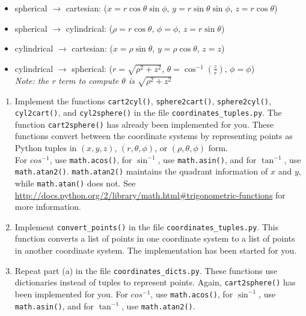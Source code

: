 \documentclass{article}
\newcounter{points}
\begin{document}
\begin{enumerate}
\begin{itemize}
\item{spherical $\rightarrow$ cartesian: ($x = r\cos\theta\sin\phi$, $y = r\sin\theta\sin\phi$, $z = r\cos\theta$)}
\item{spherical $\rightarrow$ cylindrical: ($\rho = r\cos\theta$, $\phi = \phi$, $z = r\sin\theta$)}

\item{cylindrical $\rightarrow$ cartesian: ($x = \rho\sin\theta$, $y = \rho\cos\theta$, $z = z$)}
\item{cylindrical $\rightarrow$ spherical: ($r = \sqrt{\rho^2 + z^2}$, $\theta = \cos^{-1}\left(\frac{z}{r}\right)$, $\phi = \phi$)  \\
\emph{Note: the r term to compute $\theta$ is $\sqrt{\rho^2 + z^2}$}
}
\end{itemize}

\begin{enumerate}
\item Implement the functions \texttt{cart2cyl()}, \texttt{sphere2cart()}, \texttt{sphere2cyl()}, \texttt{cyl2cart()}, and \texttt{cyl2sphere()} in the file \texttt{coordinates\_tuples.py}.  The function \texttt{cart2sphere()} has already been implemented for you.  These functions convert between the coordinate systems by representing points as Python tuples in $(x, y, z)$, $(r, \theta, \phi)$, or $(\rho, \theta, \phi)$ form. \\

For $cos^{-1}$, use \texttt{math.acos()}, for $\sin^{-1}$, use \texttt{math.asin()}, and for $\tan^{-1}$, use \texttt{math.atan2()}.  \texttt{math.atan2()} maintains the quadrant information of $x$ and $y$, while \texttt{math.atan()} does not.  See \url{http://docs.python.org/2/library/math.html#trigonometric-functions} for more information.
\end{enumerate}

\begin{enumerate}
\setcounter{enumii}{1}
\item Implement \texttt{convert\_points()} in the file \texttt{coordinates\_tuples.py}.  This function converts a list of points in one coordinate system to a list of points in another coordinate system.  The implementation has been started for you.
\end{enumerate}

\begin{enumerate}
\setcounter{enumii}{2}
\item Repeat part (a) in the file \texttt{coordinates\_dicts.py}.  These functions use dictionaries instead of tuples to represent points.  Again, \texttt{cart2sphere()} has been implemented for you.  For $cos^{-1}$, use \texttt{math.acos()}, for $\sin^{-1}$, use \texttt{math.asin()}, and for $\tan^{-1}$, use \texttt{math.atan2()}.
\end{enumerate}


\end{enumerate}
\end{document}
